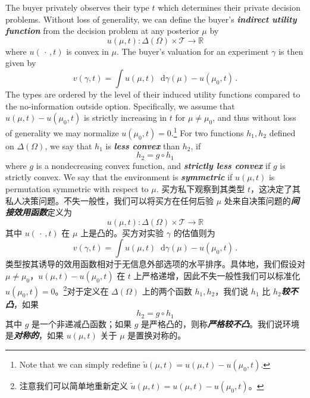 \documentclass[12pt,letterpaper]{article}
\newenvironment{original}{\color{black}\noindent}{}
\newenvironment{translation}{\color{blue}\noindent}{}
\theoremstyle{plain}
\theoremstyle{definition}
\theoremstyle{remark}
\newcommand{\R}{\mathds{R}}
\renewcommand{\1}{\mathds{1}}
\renewcommand*\d{\mathop{}\!\mathrm{d}}
\theoremstyle{definition}
\begin{document}
\begin{original}
The buyer privately observes their type $t$ which determines their private decision problems. Without loss of generality, we can define the buyer's \textit{\textbf{indirect utility function}} from the decision problem at any posterior $\mu$ by
\[u(\mu, t): \Delta(\Omega) \times \mathcal{T} \rightarrow \R\]
where $u(\,\cdot\,, t)$ is convex in $\mu$. The buyer's valuation for an experiment $\gamma$ is then given by
\[v(\gamma, t) = \int u(\mu, t) \d \gamma (\mu) - u(\mu_0, t)\,.\]
The types are ordered by the level of their induced utility functions compared to the no-information outside option. Specifically, we assume that $u(\mu, t) - u(\mu_0, t)$ is strictly increasing in $t$ for $\mu \neq \mu_0$, and thus without loss of generality we may normalize $u(\mu_0, t) = 0$.\footnote{Note that we can simply redefine $\tilde{u}(\mu, t) = u(\mu, t) - u(\mu_0, t)$.} For two functions $h_1, h_2$ defined on $\Delta(\Omega)$, we say that $h_1$ is \textit{\textbf{less convex}} than $h_2$, if
\[h_2 = g \circ h_1\]
where $g$ is a nondecreasing convex function, and \textit{\textbf{strictly less convex}} if $g$ is strictly convex. We say that the environment is \textit{\textbf{symmetric}} if $u(\mu, t)$ is permutation symmetric with respect to $\mu$.
\end{original}
\begin{translation}
买方私下观察到其类型 $t$，这决定了其私人决策问题。不失一般性，我们可以将买方在任何后验 $\mu$ 处来自决策问题的\textit{\textbf{间接效用函数}}定义为
\[u(\mu, t): \Delta(\Omega) \times \mathcal{T} \rightarrow \R\]
其中 $u(\,\cdot\,, t)$ 在 $\mu$ 上是凸的。买方对实验 $\gamma$ 的估值则为
\[v(\gamma, t) = \int u(\mu, t) \d \gamma (\mu) - u(\mu_0, t)\,.\]
类型按其诱导的效用函数相对于无信息外部选项的水平排序。具体地，我们假设对 $\mu \neq \mu_0$，$u(\mu, t) - u(\mu_0, t)$ 在 $t$ 上严格递增，因此不失一般性我们可以标准化 $u(\mu_0, t) = 0$。\footnote{注意我们可以简单地重新定义 $\tilde{u}(\mu, t) = u(\mu, t) - u(\mu_0, t)$。}对于定义在 $\Delta(\Omega)$ 上的两个函数 $h_1, h_2$，我们说 $h_1$ 比 $h_2$\textit{\textbf{较不凸}}，如果
\[h_2 = g \circ h_1\]
其中 $g$ 是一个非递减凸函数；如果 $g$ 是严格凸的，则称\textit{\textbf{严格较不凸}}。我们说环境是\textit{\textbf{对称的}}，如果 $u(\mu, t)$ 关于 $\mu$ 是置换对称的。
\end{translation}
\end{document}
